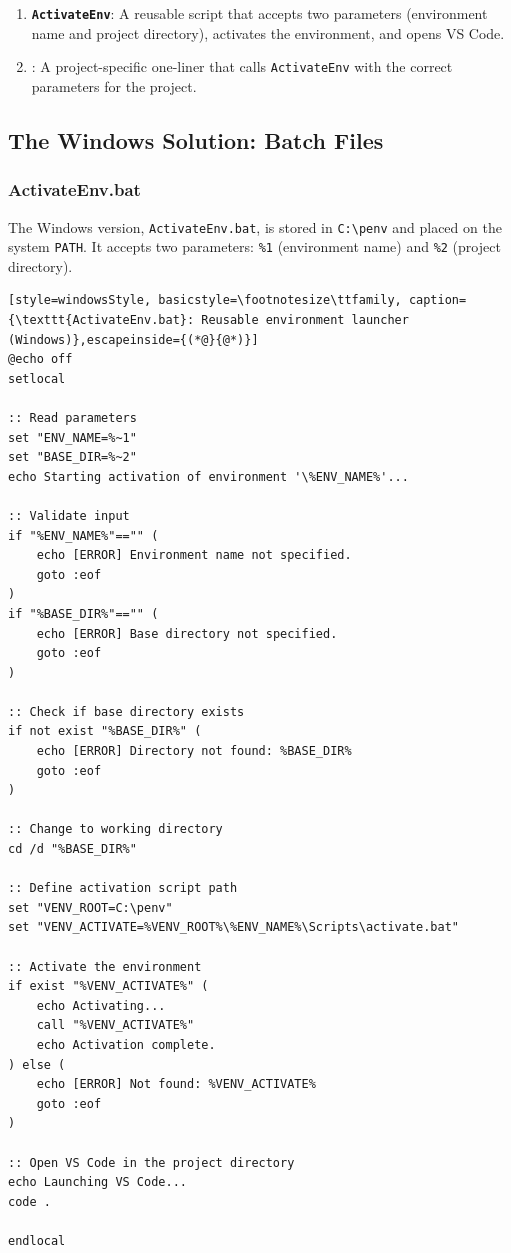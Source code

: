 \begin{enumerate}
  \item \textbf{\texttt{ActivateEnv}}: A reusable script that accepts
        two parameters (environment name and project directory), activates
        the environment, and opens VS Code.
  \item \textbf{\texttt{\ProjectName}}: A project-specific one-liner that calls
        \texttt{ActivateEnv} with the correct parameters for the \ProjectName{}
        project.
\end{enumerate}

\subsection{The Windows Solution: Batch Files}

\subsubsection{ActivateEnv.bat}

The Windows version, \texttt{ActivateEnv.bat}, is stored in
\texttt{C:\textbackslash penv} and placed on the system \texttt{PATH}.
It accepts two parameters: \texttt{\%1} (environment name) and
\texttt{\%2} (project directory).

\begin{lstlisting}[style=windowsStyle, basicstyle=\footnotesize\ttfamily, caption={\texttt{ActivateEnv.bat}: Reusable environment launcher (Windows)},escapeinside={(*@}{@*)}]
@echo off
setlocal

:: Read parameters
set "ENV_NAME=%~1"
set "BASE_DIR=%~2"
echo Starting activation of environment '\%ENV_NAME%'...

:: Validate input
if "%ENV_NAME%"=="" (
    echo [ERROR] Environment name not specified.
    goto :eof
)
if "%BASE_DIR%"=="" (
    echo [ERROR] Base directory not specified.
    goto :eof
)

:: Check if base directory exists
if not exist "%BASE_DIR%" (
    echo [ERROR] Directory not found: %BASE_DIR%
    goto :eof
)

:: Change to working directory
cd /d "%BASE_DIR%"

:: Define activation script path
set "VENV_ROOT=C:\penv"
set "VENV_ACTIVATE=%VENV_ROOT%\%ENV_NAME%\Scripts\activate.bat"

:: Activate the environment
if exist "%VENV_ACTIVATE%" (
    echo Activating...
    call "%VENV_ACTIVATE%"
    echo Activation complete.
) else (
    echo [ERROR] Not found: %VENV_ACTIVATE%
    goto :eof
)

:: Open VS Code in the project directory
echo Launching VS Code...
code .

endlocal
\end{lstlisting}


